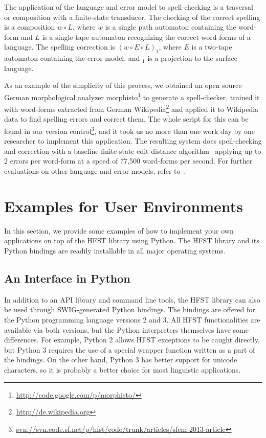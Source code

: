 \documentclass{llncs}
\begin{document}
The application of the language and error model to spell-checking is a
traversal or composition with a finite-state transducer. The checking of the correct spelling
is a composition $w \circ L$, where $w$ is a single path automaton containing
the word-form and $L$ is a single-tape automaton recognizing the correct
word-forms of a language. The spelling correction is $(w \circ E \circ L)_1$,
where $E$ is a two-tape automaton containing the error model, and $_1$ is
a projection to the surface language.

As an example of the simplicity of this process, we obtained an open source
German morphological analyzer
morphisto\footnote{\url{http://code.google.com/p/morphisto/}} to generate a
spell-checker, trained it with word-forms extracted from German
Wikipedia\footnote{\url{http://de.wikipedia.org}} and applied it to Wikipedia
data to find spelling errors and correct them. The whole script for this can be found
in our version
control\footnote{\url{svn://svn.code.sf.net/p/hfst/code/trunk/articles/sfcm-2013-article}},
and it took us no more than one work day by one researcher to implement this
application.  The resulting system does spell-checking and correction with
a baseline finite-state edit distance algorithm~\cite{pirinen2010finitestate}
applying up to 2 errors per word-form at a speed of 77,500 word-forms per second.
For further evaluations on other language and error models, refer
to~\cite{pirinen2012improving}.

\section{Examples for User Environments}\label{hfst:env-examples}

In this section, we provide some examples of how to implement your own applications on top of the HFST library using Python. The HFST library and its Python bindings are readily installable in all major operating systems.

\subsection{An Interface in Python}

In addition to an API library and command line tools, the HFST library can
also be used through SWIG-generated Python bindings. The bindings are
offered for the Python programming language versions 2 and 3. All HFST
functionalities are available via both versions, but the Python
interpreters themselves have some differences. For example, Python 2
allows HFST exceptions to be caught directly, but Python 3 requires
the use of a special wrapper function written as a part of the
bindings. On the other hand, Python 3 has better support for unicode
characters, so it is probably a better choice for most linguistic
applications.
\end{document}

